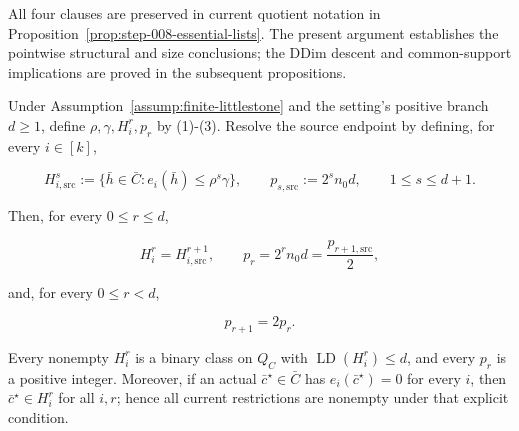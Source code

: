 All four clauses are preserved in current quotient notation in
Proposition~\ref{prop:step-008-essential-lists}. The present argument
establishes the pointwise structural and size conclusions; the DDim descent
and common-support implications are proved in the subsequent propositions.

\begin{lemma}\label{lem:step-008-stage-map}
Under Assumption~\ref{assump:finite-littlestone} and the setting's
positive branch \(d\ge1\), define \(\rho,\gamma,H_i^r,p_r\) by (1)-(3).
Resolve the source endpoint by defining, for every \(i\in[k]\),

\[
 H_{i,\mathrm{src}}^s
 :=\{\bar h\in\bar C:e_i(\bar h)\le\rho^s\gamma\},
 \qquad
 p_{s,\mathrm{src}}:=2^s n_0d,
 \qquad 1\le s\le d+1.
\tag{14}
\]

Then, for every \(0\le r\le d\),

\[
 H_i^r=H_{i,\mathrm{src}}^{r+1},
 \qquad
 p_r=2^rn_0d=\frac{p_{r+1,\mathrm{src}}}{2},
\tag{15}
\]

and, for every \(0\le r<d\),

\[
 p_{r+1}=2p_r.
\tag{16}
\]

Every nonempty \(H_i^r\) is a binary class on \(Q_C\) with
\(\operatorname{LD}(H_i^r)\le d\), and every \(p_r\) is a positive integer.
Moreover, if an actual \(\bar c^\star\in\bar C\) has
\(e_i(\bar c^\star)=0\) for every \(i\), then
\(\bar c^\star\in H_i^r\) for all \(i,r\); hence all current restrictions
are nonempty under that explicit condition.


\end{lemma}

